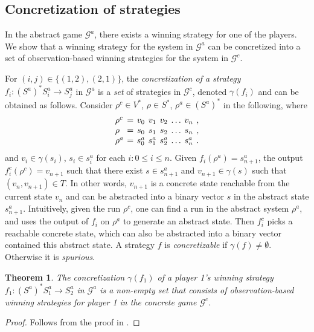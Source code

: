 \documentclass[letterpaper, 10 pt, conference]{ieeeconf}
\newtheorem{theorem}{Theorem}
\begin{document}
\subsection{Concretization of strategies}
In the abstract game $\mathcal{G}^a$, there exists a winning strategy
for one of the players. We show that a winning strategy for the system
in $\mathcal{G}^a$ can be concretized into a set of observation-based
winning strategies for the system in $\mathcal{G}^c$.

For $(i,j)\in\{(1,2),(2,1)\}$, the
  \emph{concretization of a strategy} $f_i: (S^a)^\ast S^a_i
  \rightarrow S^a_j$ in $\mathcal{G}^a$ is a \emph{set} of strategies in $\mathcal{G}^c$, denoted
  $\gamma(f_i)$ and can be obtained as follows. Consider $\rho^c \in
  V^\ast$, $\rho \in S^\ast$, $\rho^a\in (S^a)^\ast$ in the following,
  where
\vspace{-1ex}
\[\arraycolsep=2pt
\begin{array}{l ccccccl}
\rho^c &= & v_0 & v_1 &v_2 & \ldots & v_n &,\\
\rho &= & s_0 & s_1 & s_2 & \ldots & s_n  &, \\
\rho^a &= & s^a_0 & s^a_1 & s^a_2 & \ldots & s^a_n &. \\
\end{array}
\]  
and $v_i \in \gamma(s_i)$, $s_i\in s^a_i$ for each $i: 0\le i\le n$.
Given $f_i(\rho^a ) = s^a_{n+1}$, the output $f_i^c (\rho^c)= v_{n+1}
$ such that there exist $ s\in s^a_{n+1}$ and $v_{n+1}\in \gamma(s) $ such that $
(v_n,v_{n+1})\in T$. In other words, $v_{n+1}$ is a concrete state
reachable from the current state $v_n$ and can be abstracted into a
binary vector $s$ in the abstract state $s^a_{n+1}$. Intuitively,
given the run $\rho^c$, one can find a run in the abstract system
$\rho^a$, and uses the output of $f_i$ on $\rho^a$ to generate an
abstract state. Then $f_i^c$ picks a reachable concrete state, which
can also be abstracted into a binary vector contained this abstract
state. A strategy $f$ is \emph{concretizable} if $\gamma(f)\ne
\emptyset$. Otherwise it is \emph{spurious}.


\begin{theorem}\label{thm:soundness}
The concretization $\gamma(f_1)$ of a player 1's winning strategy
$f_1: (S^a)^\ast S^a_1\rightarrow S^a_2$ in $\mathcal{G}^a$ is a non-empty set that consists of observation-based winning
strategies for player 1 in the concrete game $\mathcal{G}^c$.
\end{theorem}
\begin{proof}
Follows from the proof in \cite{rayna-report}.
\end{proof}
\end{document}
